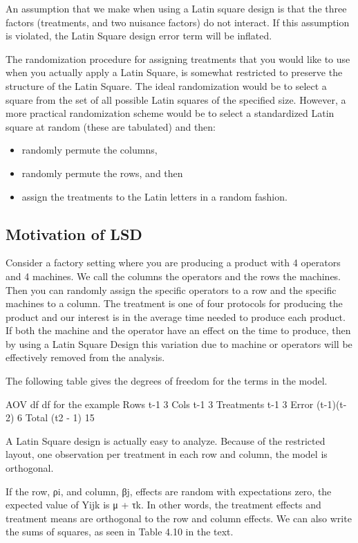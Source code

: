 \documentclass[]{article}
\begin{document}
An assumption that we make when using a Latin square design is that the three factors (treatments, and two nuisance factors) do not interact. If this assumption is violated, the Latin Square design error term will be inflated.

The randomization procedure for assigning treatments that you would like to use when you actually apply a Latin Square, is somewhat restricted to preserve the structure of the Latin Square. The ideal randomization would be to select a square from the set of all possible Latin squares of the specified size.  However, a more practical randomization scheme would be to select a standardized Latin square at random (these are tabulated) and then:

\begin{itemize}
	\item randomly permute the columns,
	\item randomly permute the rows, and then
	\item assign the treatments to the Latin letters in a random fashion.
\end{itemize}

\subsection{Motivation of LSD}

Consider  a factory setting where you are producing a product with 4 operators and 4 machines. We call the columns the operators and the rows the machines. Then you can randomly assign the specific operators to a row and the specific machines to a column. The treatment is one of four protocols for producing the product and our interest is in the average time needed to produce each product.  If both the machine and the operator have an effect on the time to produce, then by using a Latin Square Design this variation due to machine or operators will be effectively removed from the analysis.

The following table gives the degrees of freedom for the terms in the model.

AOV
df
df for the example
Rows
t-1
3
Cols
t-1
3
Treatments
t-1
3
Error
(t-1)(t-2)
6
Total
(t2 - 1)
15

A Latin Square design is actually easy to analyze.  Because of the restricted layout, one observation per treatment in each row and column, the model is orthogonal.

If the row, ρi, and column, βj, effects are random with expectations zero, the expected value of Yijk is μ + τk. In other words, the treatment effects and treatment means are orthogonal to the row and column effects.  We can also write the sums of squares, as seen in Table 4.10 in the text.
\end{document}
